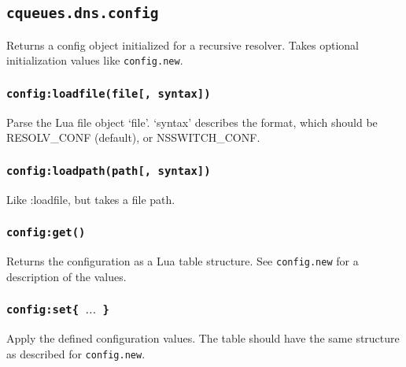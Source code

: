 \documentclass[11pt, oneside]{memoir}
\newcommand*{\fn}[1]{\texttt{#1}\xspace}
\newcounter{toccols}
\newenvironment{Module}[1]{
	\subsection{\texttt{#1}}
	\addtocontents{toc}{
		\protect\begin{multicols}{\value{toccols}}
	}
}{
	\addtocontents{toc}{\protect\end{multicols}}
}
\begin{document}
\begin{Module}{cqueues.dns.config}
Returns a config object initialized for a recursive resolver. Takes optional initialization values like \fn{config.new}.

\subsubsection[\fn{config:loadfile}]{\fn{config:loadfile(file[, syntax])}}

Parse the Lua file object `file'. `syntax' describes the format, which should be RESOLV\_CONF (default), or NSSWITCH\_CONF.

\subsubsection[\fn{config:loadpath}]{\fn{config:loadpath(path[, syntax])}}

Like :loadfile, but takes a file path.

\subsubsection[\fn{config:get}]{\fn{config:get()}}

Returns the configuration as a Lua table structure. See \fn{config.new} for a description of the values.

\subsubsection[\fn{config:set}]{\fn{config:set\{ $\ldots$ \}}}

Apply the defined configuration values. The table should have the same structure as described for \fn{config.new}.

\end{Module}
\end{document}
